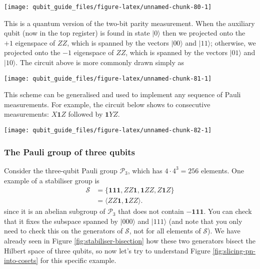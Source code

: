 \documentclass[fleqn]{article}
\begin{document}
\begin{center}\texttt{[image: qubit\_guide\_files/figure-latex/unnamed-chunk-80-1]} \end{center}

This is a quantum version of the two-bit parity measurement.
When the auxiliary qubit (now in the top register) is found in state \(|0\rangle\) then we projected onto the \(+1\) eigenspace of \(ZZ\), which is spanned by the vectors \(|00\rangle\) and \(|11\rangle\); otherwise, we projected onto the \(-1\) eigenspace of \(ZZ\), which is spanned by the vectors \(|01\rangle\) and \(|10\rangle\).
The circuit above is more commonly drawn simply as

\begin{center}\texttt{[image: qubit\_guide\_files/figure-latex/unnamed-chunk-81-1]} \end{center}

This scheme can be generalised and used to implement any sequence of Pauli measurements.
For example, the circuit below shows to consecutive measurements: \(X\mathbf{1}Z\) followed by \(\mathbf{1}YZ\).

\begin{center}\texttt{[image: qubit\_guide\_files/figure-latex/unnamed-chunk-82-1]} \end{center}

\hypertarget{pauli-group-three-qubits-worked-example}{%
\subsubsection{The Pauli group of three qubits}\label{pauli-group-three-qubits-worked-example}}

Consider the three-qubit Pauli group \(\mathcal{P}_3\), which has \(4\cdot 4^3=256\) elements.
One example of a stabiliser group is
\[
  \begin{aligned}
    \mathcal{S}
    &= \{\mathbf{1}\mathbf{1}\mathbf{1},ZZ\mathbf{1},\mathbf{1}ZZ, Z\mathbf{1}Z\}
  \\&= \langle ZZ\mathbf{1},\mathbf{1}ZZ\rangle.
  \end{aligned}
\]
since it is an abelian subgroup of \(\mathcal{P}_3\) that does not contain \(-\mathbf{1}\mathbf{1}\mathbf{1}\).
You can check that it fixes the subspace spanned by \(|000\rangle\) and \(|111\rangle\) (and note that you only need to check this on the generators of \(\mathcal{S}\), not for all elements of \(\mathcal{S}\)).
We have already seen in Figure \ref{fig:stabiliser-bisection} how these two generators bisect the Hilbert space of three qubits, so now let's try to understand Figure \ref{fig:slicing-pn-into-cosets} for this specific example.
\end{document}
